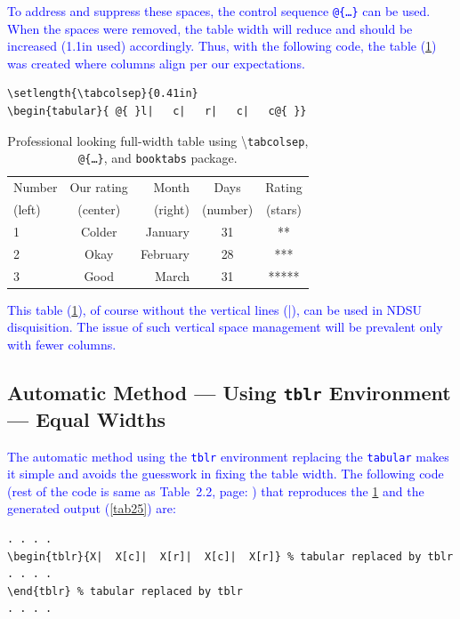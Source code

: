 \documentclass[phd,showgrids]{ndsu-thesis-2022}
\newcommand\italk[1]{\textcolor{blue}{#1}}  %
\newcommand\cmd[1]{\textbackslash\texttt{#1}}  %
\newcommand\vb[1]{\textcolor{blue}{\texttt{#1}}}%
\begin{document}
\italk{To address and suppress these spaces, the control sequence \vb{@\{\ldots\}} can be used. When the spaces were removed, the table width will reduce and should be increased (1.1in used) accordingly. Thus, with the following code, the table (\cref{tab24}) was created where columns align per our expectations.
}

{\singlespacing
\begin{verbatim}
\setlength{\tabcolsep}{0.41in}
\begin{tabular}{ @{ }l|   c|   r|   c|   c@{ }}
\end{verbatim}
}

\begin{table}[h!]
\centering
\caption{Professional looking full-width table using \cmd{tabcolsep}, \texttt{@\{\ldots\}}, and \texttt{booktabs} package.}
\setlength{\tabcolsep}{0.41in}
\begin{tabular}{ @{ }l|   c|   r|   c|   c@{ }}
\toprule
Number & Our rating & Month & Days & Rating\\
(left) & (center)   & (right) & (number) & (stars)\\
\midrule
1 & Colder & January & 31 & **\\
2 & Okay   & February & 28 & ***\\
3 & Good   & March & 31 & *****\\
\bottomrule
\end{tabular}
\label{tab24}
\end{table}

\italk{This table (\cref{tab24}), of course without the vertical lines (|), can be used in NDSU disquisition. The issue of such vertical space management will be prevalent only with fewer columns.}

\subsection{Automatic Method --- Using \texttt{tblr} Environment --- Equal Widths}
\italk{The automatic method using the \vb{tblr} environment replacing the \vb{tabular} makes it simple and avoids the guesswork in fixing the table width. The following code (rest of the code is same as Table~2.2, page: \pageref{tabcode22}) that reproduces the \cref{tab24} and the generated output (\cref{tab25}) are:} 

{\singlespacing
\begin{verbatim}
. . . . 
\begin{tblr}{X|  X[c]|  X[r]|  X[c]|  X[r]} % tabular replaced by tblr
. . . . 
\end{tblr} % tabular replaced by tblr
. . . .
\end{verbatim}
}
\end{document}
